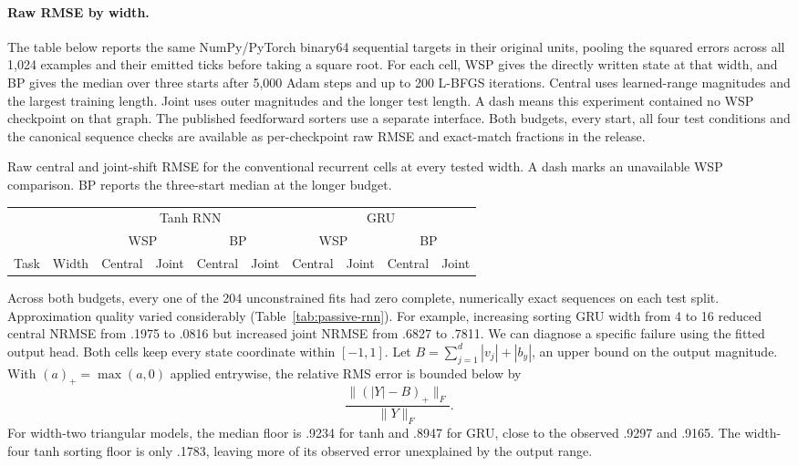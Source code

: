 \paragraph{Raw RMSE by width.}
The table below reports the same NumPy/PyTorch binary64 sequential targets in their original units, pooling the squared errors across all 1,024 examples and their emitted ticks before taking a square root. For each cell, WSP gives the directly written state at that width, and BP gives the median over three starts after 5,000 Adam steps and up to 200 L-BFGS iterations. Central uses learned-range magnitudes and the largest training length. Joint uses outer magnitudes and the longer test length. A dash means this experiment contained no WSP checkpoint on that graph. The published feedforward sorters use a separate interface. Both budgets, every start, all four test conditions and the canonical sequence checks are available as per-checkpoint raw RMSE and exact-match fractions in the release.
\begin{center}
\begin{minipage}{\linewidth}
\centering
\makeatletter{}\makeatother
\caption{Raw central and joint-shift RMSE for the conventional recurrent cells at every tested width. A dash marks an unavailable WSP comparison. BP reports the three-start median at the longer budget.}\label{tab:recur_rmse}
\scriptsize\setlength{\tabcolsep}{3pt}
\begin{tabular}{@{}lr rrrr rrrr@{}}\toprule
&&\multicolumn{4}{c}{Tanh RNN} & \multicolumn{4}{c}{GRU}\\
&&\multicolumn{2}{c}{WSP}&\multicolumn{2}{c}{BP}&\multicolumn{2}{c}{WSP}&\multicolumn{2}{c}{BP}\\
Task & Width & Central & Joint & Central & Joint & Central & Joint & Central & Joint\\\midrule

\end{tabular}
\end{minipage}
\end{center}

Across both budgets, every one of the 204 unconstrained fits had zero complete, numerically exact sequences on each test split. Approximation quality varied considerably (Table~\ref{tab:passive-rnn}). For example, increasing sorting GRU width from 4 to 16 reduced central NRMSE from .1975 to .0816 but increased joint NRMSE from .6827 to .7811. We can diagnose a specific failure using the fitted output head. Both cells keep every state coordinate within \([-1,1]\). Let \(B=\sum_{j=1}^d |v_j|+|b_y|\), an upper bound on the output magnitude. With \((a)_+=\max(a,0)\) applied entrywise, the relative RMS error is bounded below by
\[
              \frac{\|(|Y|-B)_+\|_F}{\|Y\|_F}.
\]
For width-two triangular models, the median floor is .9234 for tanh and .8947 for GRU, close to the observed .9297 and .9165. The width-four tanh sorting floor is only .1783, leaving more of its observed error unexplained by the output range.

